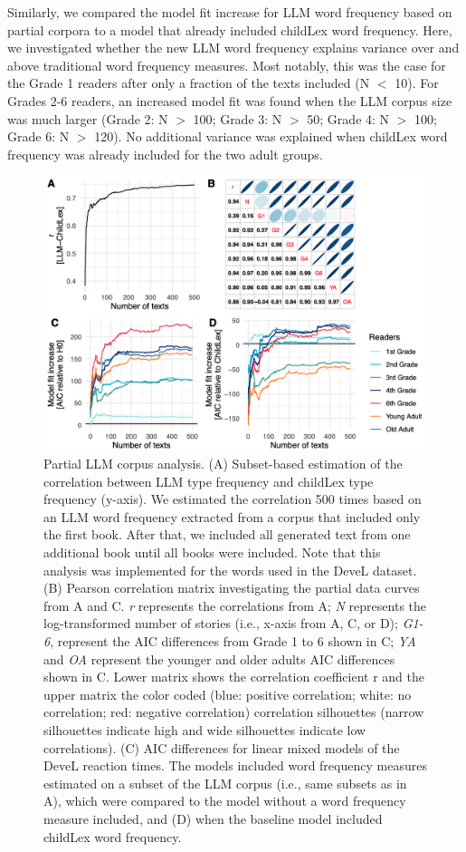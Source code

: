 \documentclass[doc, a4paper, anonymous]{apa7}
\begin{document}
Similarly, we compared the model fit increase for LLM word frequency based on partial corpora to a model that already included childLex word frequency. Here, we investigated whether the new LLM word frequency explains variance over and above traditional word frequency measures. Most notably, this was the case for the Grade 1 readers after only a fraction of the texts included (N $<$ 10). For Grades 2-6 readers, an increased model fit was found when the LLM corpus size was much larger (Grade 2: N $>$ 100; Grade 3: N $>$ 50; Grade 4: N $>$ 100; Grade 6: N $>$ 120). No additional variance was explained when childLex word frequency was already included for the two adult groups. 


\begin{figure}[t]
    \includegraphics[width = 0.8\paperwidth]{figures/partial_fig.png}
    \caption{Partial LLM corpus analysis. (A) Subset-based estimation of the correlation between LLM type frequency and childLex type frequency (y-axis). We estimated the correlation 500 times based on an LLM word frequency extracted from a corpus that included only the first book. After that, we included all generated text from one additional book until all books were included. Note that this analysis was implemented for the words used in the DeveL dataset. (B) Pearson correlation matrix investigating the partial data curves from A and C. \textit{r} represents the correlations from A; \textit{N} represents the log-transformed number of stories (i.e., x-axis from A, C, or D); \textit{G1-6}, represent the AIC differences from Grade 1 to 6 shown in C; \textit{YA} and \textit{OA} represent the younger and older adults AIC differences shown in C. Lower matrix shows the correlation coefficient r and the upper matrix the color coded (blue: positive correlation; white: no correlation; red: negative correlation) correlation silhouettes (narrow silhouettes indicate high and wide silhouettes indicate low correlations). (C) AIC differences for linear mixed models of the DeveL reaction times. The models included word frequency measures estimated on a subset of the LLM corpus (i.e., same subsets as in A), which were compared to the model without a word frequency measure included, and (D) when the baseline model included childLex word frequency.}
    \label{fig:partial_data}
\end{figure}
\end{document}
